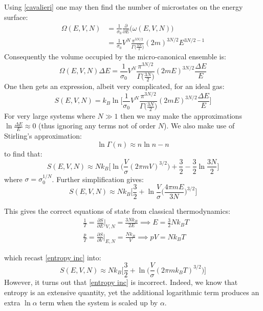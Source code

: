 \documentclass[a4paper,11pt,oneside]{book}
\begin{document}
Using \eqref{cavalieri} one may then find the number of microstates on the energy surface:
\begin{align}
    \Omega(E,V,N) &= \frac{1}{\sigma_0} \frac{\partial}{\partial E}\bigg(\omega(E,V,N)\bigg) \\
    &=\frac{1}{\sigma_0}V^N \frac{\pi^{3N/2}}{ \Gamma\big(\frac{3N}{2}\big)}(2m)^{3N/2}E^{3N/2-1}
\end{align}
Consequently the volume occupied by the micro-canonical ensemble is:
\begin{equation}
    \Omega(E,V,N) \Delta E = \frac{1}{\sigma_0}V^N \frac{\pi^{3N/2}}{ \Gamma\big(\frac{3N}{2}\big)}(2mE)^{3N/2}\frac{\Delta E}{E}
\end{equation}
One then gets an expression, albeit very complicated, for an ideal gas:
\begin{equation}
    S(E,V,N) = k_B \ln \bigg[\frac{1}{\sigma_0}V^N \frac{\pi^{3N/2}}{ \Gamma\big(\frac{3N}{2}\big)}(2mE)^{3N/2}\frac{\Delta E}{E}\bigg]
\end{equation}
For very large systems where $N\gg 1$ then we may make the approximations $\ln \frac{\Delta E}{E} \approx 0$ (thus ignoring any terms not of order $N$). We also make use of Stirling's approximation:
\begin{equation}
    \ln \Gamma(n) \approx n \ln n - n
\end{equation}
to find that:
\begin{equation}
      S(E,V,N) \approx Nk_B \bigg[\ln \bigg(\frac{V}{\sigma}(2\pi mV)^{3/2}\bigg)+\frac{3}{2}-\frac{3}{2}\ln \frac{3N}{2}\bigg]
\end{equation}
where $\sigma = \sigma_0^{1/N}$. Further simplification gives:
\begin{equation}\label{entropy inc}
    S(E,V,N) \approx Nk_B \bigg[\frac{3}{2}+\ln\frac{V}{\sigma} \bigg(\frac{4 \pi m E}{3N}\bigg)^{3/2}\bigg]
\end{equation}

This gives the correct equations of state from classical thermodynamics:
\begin{align}
    &\frac{1}{T} = \frac{\partial S}{\partial E} \bigg|_{V,N} = \frac{3 Nk_B}{2E} \implies E = \frac{3}{2} Nk_BT\\
    &\frac{p}{T} = \frac{\partial S}{\partial V}\bigg|_{E,N} = \frac{Nk_B}{V} \implies pV = Nk_BT
\end{align}

which recast \eqref{entropy inc} into:
\begin{equation}\label{entropy ideal}
    S(E,V,N) \approx Nk_B \bigg[\frac{3}{2}+\ln\bigg( \frac{V}{\sigma}(2 \pi m k_B T)^{3/2}\bigg)\bigg]
\end{equation}
However, it turns out that \eqref{entropy inc} is incorrect. Indeed, we know that entropy is an extensive quantity, yet the additional logarithmic term produces an extra $\ln \alpha$ term when the system is scaled up by $\alpha$. 
\end{document}
